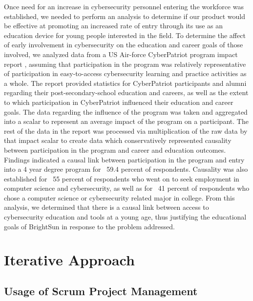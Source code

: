 \documentclass[openright]{report}
\begin{document}
\par Once need for an increase in cybersecurity personnel entering the workforce was established, we needed to perform an analysis to determine if our product would be effective at promoting an increased rate of entry through its use as an education device for young people interested in the field. To determine the affect of early involvement in cybersecurity on the education and career goals of those involved, we analyzed data from a US Air-force CyberPatriot program impact report \cite{cyberpatriot}, assuming that participation in the program was relatively representative of participation in easy-to-access cybersecurity learning and practice activities as a whole. The report provided statistics for CyberPatriot participants and alumni regarding their post-secondary-school education and careers, as well as the extent to which participation in CyberPatriot influenced their education and career goals. The data regarding the influence of the program was taken and aggregated into a scalar to represent an average impact of the program on a participant. The rest of the data in the report was processed via multiplication of the raw data by that impact scalar to create data which conservatively represented causality between participation in the program and career and education outcomes. Findings indicated a causal link between participation in the program and entry into a 4 year degree program for ~59.4 percent of respondents. Causality was also established for ~55 percent of respondents who went on to seek employment in computer science and cybersecurity, as well as for ~41 percent of respondents who chose a computer science or cybersecurity related major in college. From this analysis, we determined that there is a causal link between access to cybersecurity education and tools at a young age, thus justifying the educational goals of BrightSun in response to the problem addressed. 

\chapter{Iterative Approach}

\section{Usage of Scrum Project Management}
\end{document}
